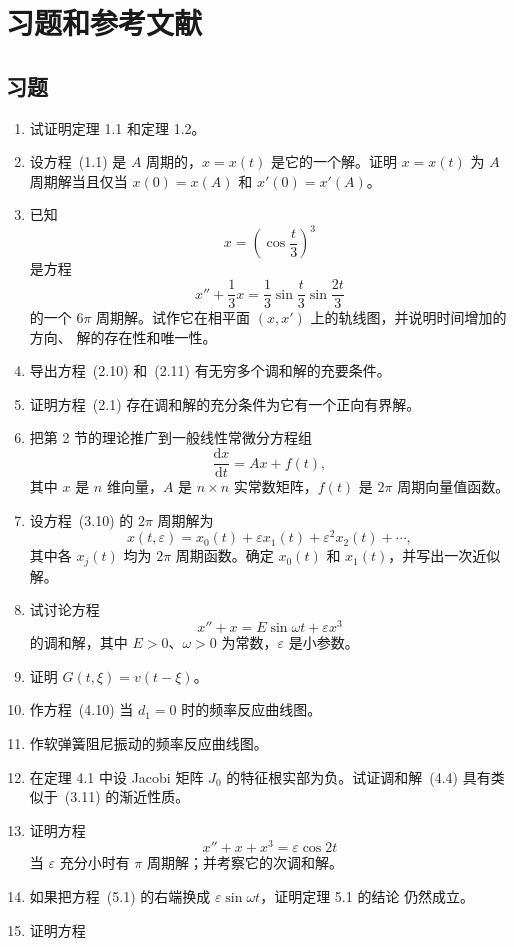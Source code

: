 \section*{习题和参考文献}
\subsection*{习题}

\begin{enumerate}
  \item 试证明定理 1.1 和定理 1.2。
  \item 设方程~(1.1) 是 $A$ 周期的，$x=x(t)$ 是它的一个解。证明 $x=x(t)$ 为
  $A$ 周期解当且仅当 $x(0)=x(A)$ 和 $x'(0)=x'(A)$。
  \item 已知
  \[
    x=\left(\cos\frac t3\right)^3
  \]
  是方程
  \[
    x''+\frac13x=\frac13\sin\frac t3\sin\frac{2t}{3}
  \]
  的一个 $6\pi$ 周期解。试作它在相平面 $(x,x')$ 上的轨线图，并说明时间增加的方向、
  解的存在性和唯一性。
  \item 导出方程~(2.10) 和~(2.11) 有无穷多个调和解的充要条件。
  \item 证明方程~(2.1) 存在调和解的充分条件为它有一个正向有界解。
  \item 把第 2 节的理论推广到一般线性常微分方程组
  \[
    \frac{\mathrm dx}{\mathrm dt}=Ax+f(t),
  \]
  其中 $x$ 是 $n$ 维向量，$A$ 是 $n\times n$ 实常数矩阵，$f(t)$ 是 $2\pi$ 周期向量值函数。
  \item 设方程~(3.10) 的 $2\pi$ 周期解为
  \[
    x(t,\varepsilon)=x_0(t)+\varepsilon x_1(t)+\varepsilon^2x_2(t)+\cdots,
  \]
  其中各 $x_j(t)$ 均为 $2\pi$ 周期函数。确定 $x_0(t)$ 和 $x_1(t)$，并写出一次近似解。
  \item 试讨论方程
  \[
    x''+x=E\sin\omega t+\varepsilon x^3
  \]
  的调和解，其中 $E>0$、$\omega>0$ 为常数，$\varepsilon$ 是小参数。
  \item 证明 $G(t,\xi)=v(t-\xi)$。
  \item 作方程~(4.10) 当 $d_1=0$ 时的频率反应曲线图。
  \item 作软弹簧阻尼振动的频率反应曲线图。
  \item 在定理 4.1 中设 Jacobi 矩阵 $J_0$ 的特征根实部为负。试证调和解~(4.4)
  具有类似于~(3.11) 的渐近性质。
  \item 证明方程
  \[
    x''+x+x^3=\varepsilon\cos2t
  \]
  当 $\varepsilon$ 充分小时有 $\pi$ 周期解；并考察它的次调和解。
  \item 如果把方程~(5.1) 的右端换成 $\varepsilon\sin\omega t$，证明定理 5.1 的结论
  仍然成立。
  \item 证明方程

\end{enumerate}
